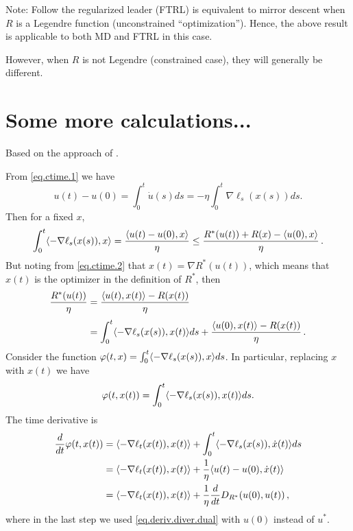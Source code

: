 \documentclass[12pt]{article}
\theoremstyle{plain}
\theoremstyle{definition}
\theoremstyle{remark}
\begin{document}
Note: Follow the regularized leader (FTRL) is equivalent to mirror descent when $R$ is a Legendre function
(unconstrained ``optimization'').
Hence, the above result is applicable to both MD and FTRL in this case.

However, when $R$ is not Legendre (constrained case), they will generally be different.




\section*{Some more calculations...}

Based on the approach of \cite{Kwon-M}.

\bigskip

\noindent
From \eqref{eq.ctime.1} we have
$$
u(t) - u(0) = \int_{0}^{t} \dot{u}(s) ds = -\eta \int_{0}^{t} \nabla\ell_{s}(x(s)) ds.
$$
Then for a fixed $x$,
\begin{equation}
\int_{0}^{t} \langle {-\nabla\ell_{s}(x(s)), x}\rangle
= \frac{\langle {u(t) - u(0), x}\rangle}{\eta}
\leq \frac{R^{*}(u(t)) + R(x) - \langle {u(0),x}\rangle}{\eta}\,.
\label{eq.using.fenchel.ineq}
\end{equation}
But noting from \eqref{eq.ctime.2} that $x(t) = \nabla R^{*}(u(t))$, 
which means that $x(t)$ is the optimizer in the definition of $R^{*}$, 
then
\begin{align}
\frac{R^{*}(u(t))}{\eta}
&= \frac{\langle {u(t), x(t)}\rangle - R(x(t))}{\eta} \notag \\[1mm]
&= \int_{0}^{t} \langle {-\nabla\ell_{s}(x(s)), x(t)}\rangle ds + \frac{\langle {u(0),x(t)}\rangle-R(x(t))}{\eta}\,.
\label{eq.something}
\end{align}
Consider the function $\varphi(t,x) = \int_{0}^{t} \langle {-\nabla\ell_{s}(x(s)), x}\rangle ds$.
In particular, replacing $x$ with $x(t)$ we have
$$
\varphi(t,x(t)) = \int_{0}^{t} \langle {-\nabla\ell_{s}(x(s)), x(t)}\rangle ds.
$$
The time derivative is
\begin{align*}
\frac{d}{dt}\varphi(t,x(t))
&= \langle {-\nabla\ell_{t}(x(t)), x(t)}\rangle + \int_{0}^{t} \langle {-\nabla\ell_{s}(x(s)), \dot{x}(t)}\rangle ds \\
&= \langle {-\nabla\ell_{t}(x(t)), x(t)}\rangle + \frac{1}{\eta} \langle {u(t) - u(0), \dot{x}(t)}\rangle \\
&= \langle {-\nabla\ell_{t}(x(t)), x(t)}\rangle + \frac{1}{\eta} \frac{d}{dt} D_{R^{*}}(u(0), u(t)) \,,
\end{align*}
where in the last step we used \eqref{eq.deriv.diver.dual} with $u(0)$ instead of $u^{*}$.
\end{document}
